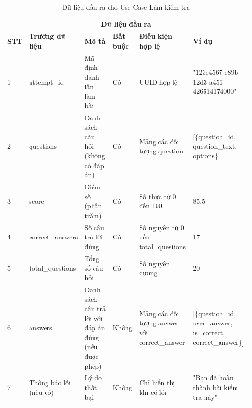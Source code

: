 \documentclass[../DoAn.tex]{subfiles}
\begin{document}
\vspace{0.5cm}

\begin{table}[h!]
\centering
\begin{tabular}{|m{1cm}|m{2.5cm}|m{3cm}|m{1cm}|m{2.5cm}|m{3.5cm}|}
    \hline
    \multicolumn{6}{|c|}{\textbf{Dữ liệu đầu ra}} \\
    \hline
    \textbf{STT} & \textbf{Trường dữ liệu} & \textbf{Mô tả} & \textbf{Bắt buộc} & \textbf{Điều kiện hợp lệ} & \textbf{Ví dụ} \\
    \hline
    1 & attempt\_id & Mã định danh lần làm bài & Có & UUID hợp lệ & "123e4567-e89b-12d3-a456-426614174000" \\
    \hline
    2 & questions & Danh sách câu hỏi (không có đáp án) & Có & Mảng các đối tượng question & [\{question\_id, question\_text, options\}] \\
    \hline
    3 & score & Điểm số (phần trăm) & Có & Số thực từ 0 đến 100 & 85.5 \\
    \hline
    4 & correct\_answers & Số câu trả lời đúng & Có & Số nguyên từ 0 đến total\_questions & 17 \\
    \hline
    5 & total\_questions & Tổng số câu hỏi & Có & Số nguyên dương & 20 \\
    \hline
    6 & answers & Danh sách câu trả lời với đáp án đúng (nếu được phép) & Không & Mảng các đối tượng answer với correct\_answer & [\{question\_id, user\_answer, is\_correct, correct\_answer\}] \\
    \hline
    7 & Thông báo lỗi (nếu có) & Lý do thất bại & Không & Chỉ hiển thị khi có lỗi & "Bạn đã hoàn thành bài kiểm tra này" \\
    \hline
\end{tabular}
\caption{Dữ liệu đầu ra cho Use Case Làm kiểm tra}
\end{table}
\end{document}

